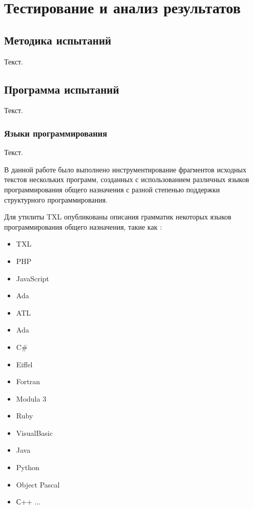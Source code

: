 \chapter{Тестирование и анализ результатов}

\section{Методика испытаний}

Текст.

\section{Программа испытаний}

Текст.

\subsection{Языки программирования}

Текст.

В данной работе было выполнено инструментирование фрагментов исходных текстов нескольких программ, созданных с использованием различных языков программирования общего назначения с разной степенью поддержки структурного программирования.

Для утилиты TXL опубликованы описания грамматик некоторых языков программирования общего назначения, такие как \cite{txl-resources}:
\begin{itemize}
  \item TXL
  \item PHP
  \item JavaScript
  \item Ada
  \item ATL
  \item Ada
  \item C\#
  \item Eiffel
  \item Fortran
  \item Modula 3
  \item Ruby
  \item VisualBasic

  \item Java
  \item Python
  \item Object Pascal
  \item С++
  ...
\end{itemize}

